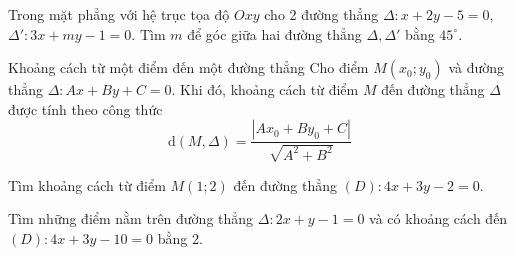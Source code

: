 \begin{bt}%
	Trong mặt phẳng với hệ trục tọa độ $Oxy$ cho 2 đường thẳng $\Delta:x + 2y - 5=0$, $\Delta':3x + my - 1=0$. Tìm $m$ để góc giữa hai đường thẳng $\Delta, \Delta'$ bằng ${45}^{\circ}$.
\end{bt}


\begin{dang}{Khoảng cách từ một điểm đến một đường thẳng}
	Cho điểm $M(x_0;y_0)$ và đường thẳng $\Delta\colon Ax+By+C=0$. Khi đó, khoảng cách từ điểm $M$ đến đường thẳng $\Delta$ được tính theo công thức $$\mathrm{d}\left(M,\Delta\right)=\dfrac{|Ax_0+By_0+C|}{\sqrt{A^2+B^2}}$$
\end{dang}

\begin{vd}%
	Tìm khoảng cách từ điểm $M(1;2)$ đến đường thẳng $(D)\colon 4x+3y-2=0$.
\end{vd}

\begin{vd}
	Tìm những điểm nằm trên đường thẳng $\Delta\colon 2x + y - 1 = 0$ và có khoảng cách đến $(D)\colon 4x + 3y - 10 = 0$ bằng $2$.
\end{vd}

